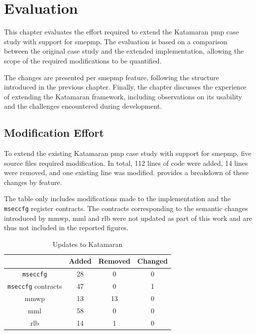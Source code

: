 \glsresetall

\chapter{Evaluation}
This chapter evaluates the effort required to extend the Katamaran \gls{pmp} case study with support for \gls{smepmp}.
The evaluation is based on a comparison between the original case study and the extended implementation, allowing the scope of the required modifications to be quantified.

The changes are presented per \gls{smepmp} feature, following the structure introduced in the previous chapter.
Finally, the chapter discusses the experience of extending the Katamaran framework, including observations on its usability and the challenges encountered during development. 

\section{Modification Effort}
To extend the existing Katamaran \gls{pmp} case study with support for \gls{smepmp}, five source files required modification.
In total, 112 lines of code were added, 14 lines were removed, and one existing line was modified.
 provides a breakdown of these changes by feature.

The table only includes modifications made to the implementation and the \texttt{mseccfg} register contracts.
The contracts corresponding to the semantic changes introduced by \gls{mmwp}, \gls{mml} and \gls{rlb} were not updated as part of this work and are thus not included in the reported figures.

\begin{table}[]
\centering
\begin{tabular}{c|ccc}
                            & Added & Removed & Changed \\
\hline
\texttt{mseccfg}            & 28    & 0       & 0       \\
\texttt{mseccfg} contracts  & 47    & 0       & 1       \\
\gls{mmwp}                  & 13    & 13      & 0       \\
\gls{mml}                   & 58    & 0       & 0       \\
\gls{rlb}                   & 14    & 1       & 0
\end{tabular}
\caption{Updates to Katamaran}
\label{table:results}
\end{table}

